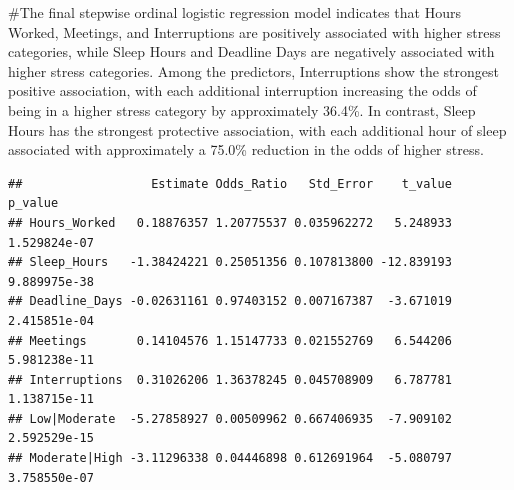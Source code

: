 \documentclass[
]{article}
\newenvironment{Shaded}{\begin{snugshade}}{\end{snugshade}}
\newcommand{\AttributeTok}[1]{\textcolor[rgb]{0.13,0.29,0.53}{#1}}
\newcommand{\ConstantTok}[1]{\textcolor[rgb]{0.56,0.35,0.01}{#1}}
\newcommand{\DecValTok}[1]{\textcolor[rgb]{0.00,0.00,0.81}{#1}}
\newcommand{\FunctionTok}[1]{\textcolor[rgb]{0.13,0.29,0.53}{\textbf{#1}}}
\newcommand{\NormalTok}[1]{#1}
\newcommand{\OtherTok}[1]{\textcolor[rgb]{0.56,0.35,0.01}{#1}}
\newcommand{\SpecialCharTok}[1]{\textcolor[rgb]{0.81,0.36,0.00}{\textbf{#1}}}
\newcommand{\StringTok}[1]{\textcolor[rgb]{0.31,0.60,0.02}{#1}}
\begin{document}
\#The final stepwise ordinal logistic regression model indicates that
Hours Worked, Meetings, and Interruptions are positively associated with
higher stress categories, while Sleep Hours and Deadline Days are
negatively associated with higher stress categories. Among the
predictors, Interruptions show the strongest positive association, with
each additional interruption increasing the odds of being in a higher
stress category by approximately 36.4\%. In contrast, Sleep Hours has
the strongest protective association, with each additional hour of sleep
associated with approximately a 75.0\% reduction in the odds of higher
stress.

\begin{Shaded}
\end{Shaded}

\begin{verbatim}
##                  Estimate Odds_Ratio   Std_Error    t_value      p_value
## Hours_Worked   0.18876357 1.20775537 0.035962272   5.248933 1.529824e-07
## Sleep_Hours   -1.38424221 0.25051356 0.107813800 -12.839193 9.889975e-38
## Deadline_Days -0.02631161 0.97403152 0.007167387  -3.671019 2.415851e-04
## Meetings       0.14104576 1.15147733 0.021552769   6.544206 5.981238e-11
## Interruptions  0.31026206 1.36378245 0.045708909   6.787781 1.138715e-11
## Low|Moderate  -5.27858927 0.00509962 0.667406935  -7.909102 2.592529e-15
## Moderate|High -3.11296338 0.04446898 0.612691964  -5.080797 3.758550e-07
\end{verbatim}
\end{document}
